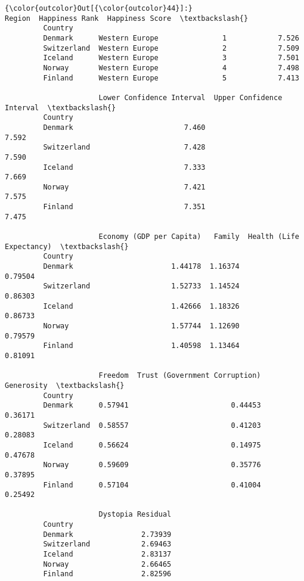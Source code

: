 \documentclass[11pt]{article}
\begin{document}
\begin{Verbatim}[commandchars=\\\{\}]
{\color{outcolor}Out[{\color{outcolor}44}]:}                      Region  Happiness Rank  Happiness Score  \textbackslash{}
         Country                                                        
         Denmark      Western Europe               1            7.526   
         Switzerland  Western Europe               2            7.509   
         Iceland      Western Europe               3            7.501   
         Norway       Western Europe               4            7.498   
         Finland      Western Europe               5            7.413   
         
                      Lower Confidence Interval  Upper Confidence Interval  \textbackslash{}
         Country                                                             
         Denmark                          7.460                      7.592   
         Switzerland                      7.428                      7.590   
         Iceland                          7.333                      7.669   
         Norway                           7.421                      7.575   
         Finland                          7.351                      7.475   
         
                      Economy (GDP per Capita)   Family  Health (Life Expectancy)  \textbackslash{}
         Country                                                                    
         Denmark                       1.44178  1.16374                   0.79504   
         Switzerland                   1.52733  1.14524                   0.86303   
         Iceland                       1.42666  1.18326                   0.86733   
         Norway                        1.57744  1.12690                   0.79579   
         Finland                       1.40598  1.13464                   0.81091   
         
                      Freedom  Trust (Government Corruption)  Generosity  \textbackslash{}
         Country                                                           
         Denmark      0.57941                        0.44453     0.36171   
         Switzerland  0.58557                        0.41203     0.28083   
         Iceland      0.56624                        0.14975     0.47678   
         Norway       0.59609                        0.35776     0.37895   
         Finland      0.57104                        0.41004     0.25492   
         
                      Dystopia Residual  
         Country                         
         Denmark                2.73939  
         Switzerland            2.69463  
         Iceland                2.83137  
         Norway                 2.66465  
         Finland                2.82596  
\end{Verbatim}
            
\end{document}
